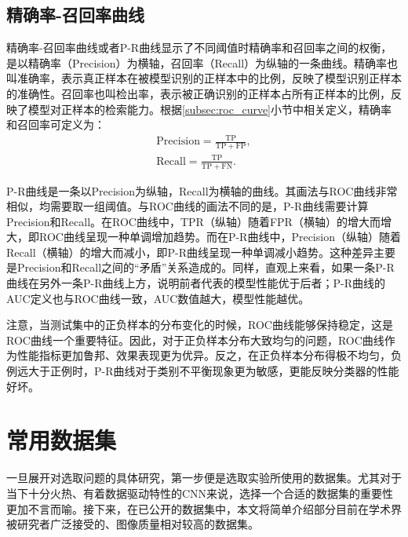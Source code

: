 \subsection{精确率-召回率曲线}\label{subsec:pr_curve}
精确率-召回率曲线或者P-R曲线显示了不同阈值时精确率和召回率之间的权衡，是以精确率（Precision）为横轴，召回率（Recall）为纵轴的一条曲线。精确率也叫准确率，表示真正样本在被模型识别的正样本中的比例，反映了模型识别正样本的准确性。召回率也叫检出率，表示被正确识别的正样本占所有正样本的比例，反映了模型对正样本的检索能力。根据\ref{subsec:roc_curve}小节中相关定义，精确率和召回率可定义为：
\begin{gather}
	\mathrm{Precision}=\frac{\mathrm{TP}}{\mathrm{TP}+\mathrm{FP}},\\
	\mathrm{Recall}=\frac{\mathrm{TP}}{\mathrm{TP}+\mathrm{FN}}.
\end{gather}


P-R曲线是一条以Precision为纵轴，Recall为横轴的曲线。其画法与ROC曲线非常相似，均需要取一组阈值。与ROC曲线的画法不同的是，P-R曲线需要计算Precision和Recall。在ROC曲线中，TPR（纵轴）随着FPR（横轴）的增大而增大，即ROC曲线呈现一种单调增加趋势。而在P-R曲线中，Precision（纵轴）随着Recall（横轴）的增大而减小，即P-R曲线呈现一种单调减小趋势。这种差异主要是Precision和Recall之间的“矛盾”关系造成的。同样，直观上来看，如果一条P-R曲线在另外一条P-R曲线上方，说明前者代表的模型性能优于后者；P-R曲线的AUC定义也与ROC曲线一致，AUC数值越大，模型性能越优。

注意，当测试集中的正负样本的分布变化的时候，ROC曲线能够保持稳定，这是ROC曲线一个重要特征。因此，对于正负样本分布大致均匀的问题，ROC曲线作为性能指标更加鲁邦、效果表现更为优异。反之，在正负样本分布得极不均匀，负例远大于正例时，P-R曲线对于类别不平衡现象更为敏感，更能反映分类器的性能好坏。

\section{常用数据集}\label{sec:usually_ds_intro}
一旦展开对选取问题的具体研究，第一步便是选取实验所使用的数据集。尤其对于当下十分火热、有着数据驱动特性的CNN来说，选择一个合适的数据集的重要性更加不言而喻。接下来，在已公开的数据集中，本文将简单介绍部分目前在学术界被研究者广泛接受的、图像质量相对较高的数据集。

